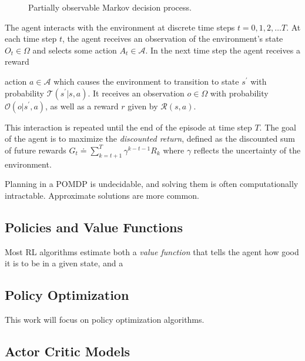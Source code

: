 \begin{figure}
    \centering
    
    \label{fig:pomdp}
    \caption{Partially observable Markov decision process.}
\end{figure}

The agent interacts with the environment at discrete time steps \(t = 0, 1, 2, \dots T\). At each time step \(t\), the agent receives an observation of the environment's state \(O_t \in \Omega\) and selects some action \(A_t \in \mathcal{A}\). In the next time step the agent receives a reward

action \(a \in \mathcal{A}\) which causes the environment to transition to state \(s^\prime\) with probability \(\mathcal{T}(s^\prime | s, a)\).
It receives an observation \(o \in \Omega\) with probability \(\mathcal{O}(o | s^\prime, a)\), as well as a reward \(r\) given by \(\mathcal{R}(s, a)\).

This interaction is repeated until the end of the episode at time step \(T\). The goal of the agent is to maximize the \textit{discounted return}, defined as the discounted sum of future rewards \(G_t \doteq \sum_{k=t+1}^T \gamma^{k-t-1} R_{k}\) where \(\gamma\) reflects the uncertainty of the environment.


Planning in a POMDP is undecidable, and solving them is often computationally intractable. Approximate solutions are more common.


\subsection{Policies and Value Functions}

Most RL algorithms estimate both a \textit{value function} that tells the agent how good it is to be in a given state, and a 

\subsection{Policy Optimization}

This work will focus on policy optimization algorithms.

\subsection{Actor Critic Models}


